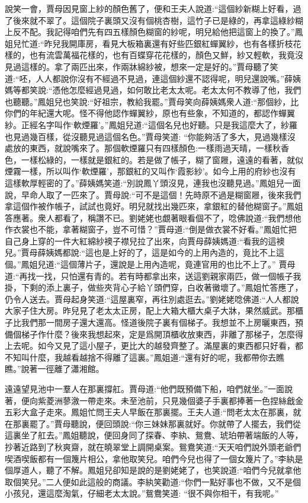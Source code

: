 \begin{parag}
    說笑一會，賈母因見窗上紗的顏色舊了，便和王夫人說道:“這個紗新糊上好看，過了後來就不翠了。這個院子裏頭又沒有個桃杏樹，這竹子已是綠的，再拿這綠紗糊上反不配。我記得咱們先有四五樣顏色糊窗的紗呢，明兒給他把這窗上的換了。”鳳姐兒忙道:“昨兒我開庫房，看見大板箱裏還有好些匹銀紅蟬翼紗，也有各樣折枝花樣的，也有流雲萬福花樣的，也有百蝶穿花花樣的，顏色又鮮，紗又輕軟，我竟沒見過這樣的。拿了兩匹出來，作兩牀綿紗被，想來一定是好的。”賈母聽了笑道:“呸，人人都說你沒有不經過不見過，連這個紗還不認得呢，明兒還說嘴。”薛姨媽等都笑說:“憑他怎麼經過見過，如何敢比老太太呢。老太太何不教導了他，我們也聽聽。”鳳姐兒也笑說:“好祖宗，教給我罷。”賈母笑向薛姨媽衆人道:“那個紗，比你們的年紀還大呢。怪不得他認作蟬翼紗，原也有些象，不知道的，都認作蟬翼紗。正經名字叫作‘軟煙羅’。”鳳姐兒道:“這個名兒也好聽。只是我這麼大了，紗羅也見過幾百樣，從沒聽見過這個名色。”賈母笑道: “你能夠活了多大，見過幾樣沒處放的東西，就說嘴來了。那個軟煙羅只有四樣顏色:一樣雨過天晴，一樣秋香色，一樣松綠的，一樣就是銀紅的。若是做了帳子，糊了窗屜，遠遠的看著，就似煙霧一樣，所以叫作‘軟煙羅’，那銀紅的又叫作‘霞影紗’。如今上用的府紗也沒有這樣軟厚輕密的了。”薛姨媽笑道:“別說鳳丫頭沒見，連我也沒聽見過。”鳳姐兒一面說，早命人取了一匹來了。賈母說:“可不是這個！先時原不過是糊窗屜，後來我們拿這個作被作帳子，試試也竟好。明兒就找出幾匹來，拿銀紅的替他糊窗子。”鳳姐答應著。衆人都看了，稱讚不已。劉姥姥也覷著眼看個不了，唸佛說道:“我們想他作衣裳也不能，拿著糊窗子，豈不可惜？”賈母道:“倒是做衣裳不好看。”鳳姐忙把自己身上穿的一件大紅綿紗襖子襟兒拉了出來，向賈母薛姨媽道:“看我的這襖兒。”賈母薛姨媽都說:“這也是上好的了，這是如今的上用內造的，竟比不上這個。”鳳姐兒道:“這個薄片子，還說是上用內造呢，竟連官用的也比不上了。” 賈母道:“再找一找，只怕還有青的。若有時都拿出來，送這劉親家兩匹，做一個帳子我掛，下剩的添上裏子，做些夾背心子給丫頭們穿，白收著黴壞了。”鳳姐忙答應了，仍令人送去。賈母起身笑道:“這屋裏窄，再往別處逛去。”劉姥姥唸佛道:“人人都說大家子住大房。昨兒見了老太太正房，配上大箱大櫃大桌子大牀，果然威武。那櫃子比我們那一間房子還大還高。怪道後院子裏有個梯子。我想並不上房曬東西，預備個梯子作什麼？後來我想起來，定是爲開頂櫃收放東西，非離了那梯子，怎麼得上去呢。如今又見了這小屋子，更比大的越發齊整了。滿屋裏的東西都只好看，都不知叫什麼，我越看越捨不得離了這裏。”鳳姐道:“還有好的呢，我都帶你去瞧瞧。”說著一徑離了瀟湘館。
\end{parag}


\begin{parag}
    遠遠望見池中一羣人在那裏撐舡。賈母道:“他們既預備下船，咱們就坐。”一面說著，便向紫菱洲蓼漵一帶走來。未至池前，只見幾個婆子手裏都捧著一色捏絲戧金五彩大盒子走來。鳳姐忙問王夫人早飯在那裏擺。王夫人道:“問老太太在那裏，就在那裏罷了。”賈母聽說，便回頭說:“你三妹妹那裏就好。你就帶了人擺去，我們從這裏坐了舡去。”鳳姐聽說，便回身同了探春、李紈、鴛鴦、琥珀帶著端飯的人等，抄著近路到了秋爽齋，就在曉翠堂上調開桌案。鴛鴦笑道:“天天咱們說外頭老爺們喫酒喫飯都有一個篾片相公，拿他取笑兒。咱們今兒也得了一個女篾片了。”李紈是個厚道人，聽了不解。鳳姐兒卻知是說的是劉姥姥了，也笑說道:“咱們今兒就拿他取個笑兒。”二人便如此這般的商議。李紈笑勸道:“你們一點好事也不做，又不是個小孩兒，還這麼淘氣，仔細老太太說。”鴛鴦笑道: “很不與你相干，有我呢。”
\end{parag}


